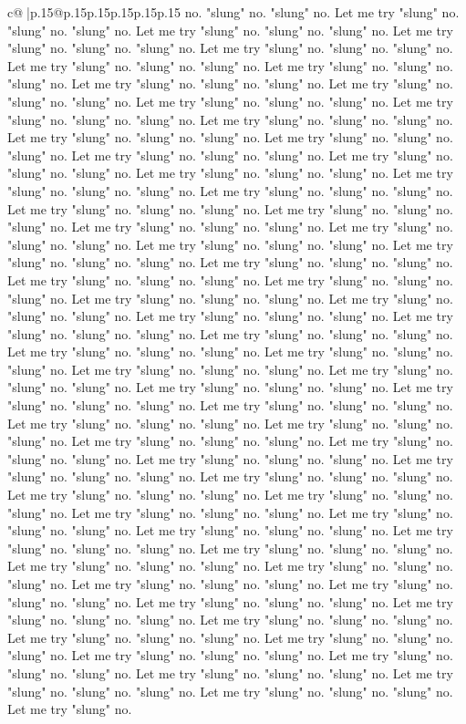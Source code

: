 \documentclass{article}
\begin{document}
{\begin{supertabular}{c@{$\;$}|p{.15\linewidth}@{}p{.15\linewidth}p{.15\linewidth}p{.15\linewidth}p{.15\linewidth}p{.15\linewidth}}
{{{no. "slung" no. "slung" no. Let me try "slung" no. "slung" no. "slung" no. Let me try "slung" no. "slung" no. "slung" no. Let me try "slung" no. "slung" no. "slung" no. Let me try "slung" no. "slung" no. "slung" no. Let me try "slung" no. "slung" no. "slung" no. Let me try "slung" no. "slung" no. "slung" no. Let me try "slung" no. "slung" no. "slung" no. Let me try "slung" no. "slung" no. "slung" no. Let me try "slung" no. "slung" no. "slung" no. Let me try "slung" no. "slung" no. "slung" no. Let me try "slung" no. "slung" no. "slung" no. Let me try "slung" no. "slung" no. "slung" no. Let me try "slung" no. "slung" no. "slung" no. Let me try "slung" no. "slung" no. "slung" no. Let me try "slung" no. "slung" no. "slung" no. Let me try "slung" no. "slung" no. "slung" no. Let me try "slung" no. "slung" no. "slung" no. Let me try "slung" no. "slung" no. "slung" no. Let me try "slung" no. "slung" no. "slung" no. Let me try "slung" no. "slung" no. "slung" no. Let me try "slung" no. "slung" no. "slung" no. Let me try "slung" no. "slung" no. "slung" no. Let me try "slung" no. "slung" no. "slung" no. Let me try "slung" no. "slung" no. "slung" no. Let me try "slung" no. "slung" no. "slung" no. Let me try "slung" no. "slung" no. "slung" no. Let me try "slung" no. "slung" no. "slung" no. Let me try "slung" no. "slung" no. "slung" no. Let me try "slung" no. "slung" no. "slung" no. Let me try "slung" no. "slung" no. "slung" no. Let me try "slung" no. "slung" no. "slung" no. Let me try "slung" no. "slung" no. "slung" no. Let me try "slung" no. "slung" no. "slung" no. Let me try "slung" no. "slung" no. "slung" no. Let me try "slung" no. "slung" no. "slung" no. Let me try "slung" no. "slung" no. "slung" no. Let me try "slung" no. "slung" no. "slung" no. Let me try "slung" no. "slung" no. "slung" no. Let me try "slung" no. "slung" no. "slung" no. Let me try "slung" no. "slung" no. "slung" no. Let me try "slung" no. "slung" no. "slung" no. Let me try "slung" no. "slung" no. "slung" no. Let me try "slung" no. "slung" no. "slung" no. Let me try "slung" no. "slung" no. "slung" no. Let me try "slung" no. "slung" no. "slung" no. Let me try "slung" no. "slung" no. "slung" no. Let me try "slung" no. "slung" no. "slung" no. Let me try "slung" no. "slung" no. "slung" no. Let me try "slung" no. "slung" no. "slung" no. Let me try "slung" no. "slung" no. "slung" no. Let me try "slung" no. "slung" no. "slung" no. Let me try "slung" no. "slung" no. "slung" no. Let me try "slung" no. "slung" no. "slung" no. Let me try "slung" no. "slung" no. "slung" no. Let me try "slung" no. "slung" no. "slung" no. Let me try "slung" no. "slung" no. "slung" no. Let me try "slung" no. "slung" no. "slung" no. Let me try "slung" no. "slung" no. "slung" no. Let me try "slung" no. "slung" no. "slung" no. Let me try "slung" no. "slung" no. "slung" no. Let me try "slung" no. "slung" no. "slung" no. Let me try "slung" no. "slung" no. "slung" no. Let me try "slung" no. "slung" no. "slung" no. Let me try "slung" no. "slung" no. "slung" no. Let me try "slung" no. "slung" no. "slung" no. Let me try "slung" no. "slung" no. "slung" no. Let me try "slung" no. "slung" no. "slung" no. Let me try "slung" no. }}}
\end{supertabular}}
\end{document}
